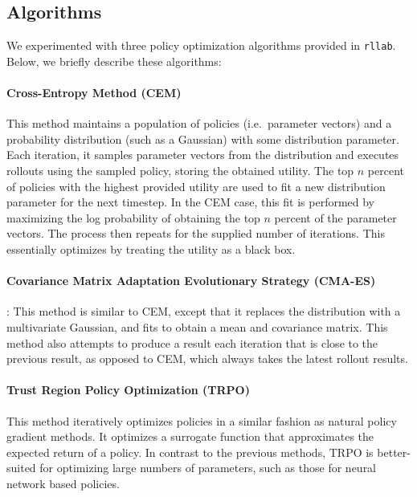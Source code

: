 \subsection{Algorithms}
We experimented with three policy optimization algorithms provided in
\texttt{rllab}. Below, we briefly describe these algorithms:

\paragraph{Cross-Entropy Method (CEM)~\cite{rubinstein2013cross,
policyoptimizationNIPS2016}}
This method maintains a population of policies (i.e.\ parameter vectors) and a
probability distribution (such as a Gaussian) with some distribution parameter.
Each iteration, it samples parameter vectors from the distribution and executes
rollouts using the sampled policy, storing the obtained utility.  The top $n$
percent of policies with the highest provided utility are used to fit a new
distribution parameter for the next timestep. In the CEM case, this fit is
performed by maximizing the log probability of obtaining the top $n$ percent of
the parameter vectors. The process then repeats for the supplied number of
iterations. This essentially optimizes by treating the utility as a black box.

\paragraph{Covariance Matrix Adaptation Evolutionary Strategy
(CMA-ES)~\cite{cmaes, policyoptimizationNIPS2016}}:
This method is similar to CEM, except that it replaces the distribution with a
multivariate Gaussian, and fits to obtain a mean and covariance matrix.  This
method also attempts to produce a result each iteration that is close to the
previous result, as opposed to CEM, which always takes the latest rollout
results.

\paragraph{Trust Region Policy Optimization (TRPO)~\cite{TRPO,
policyoptimizationNIPS2016}}
This method iteratively optimizes policies in a similar fashion as natural
policy gradient methods. It optimizes a surrogate function that approximates
the expected return of a policy.  In contrast to the previous methods, TRPO is
better-suited for optimizing large numbers of parameters, such as those for
neural network based policies.
